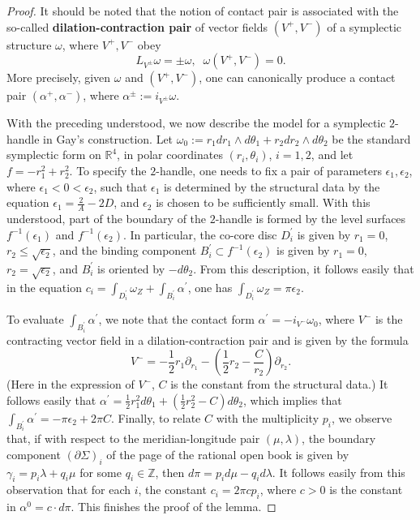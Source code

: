 \documentclass[11pt]{amsart}
\theoremstyle{plain}
\numberwithin{theorem}{section}
\theoremstyle{definition}
\newcommand{\R}{{\mathbb R}}
\newcommand{\Z}{{\mathbb Z}}
\begin{document}
\begin{proof}
It should be noted that the notion of contact pair is associated with the so-called {\bf dilation-contraction pair} of vector fields $(V^{+},V^{-})$ of a symplectic structure $\omega$, where $V^{+},V^{-}$ obey
$$
L_{V^{\pm}}\omega =\pm\omega, \;\; \omega(V^{+},V^{-})=0. 
$$
More precisely, given $\omega$ and $(V^{+},V^{-})$, one can canonically produce a contact pair 
$(\alpha^{+},\alpha^{-})$, where $\alpha^{\pm}:= i_{V^{\pm}}\omega$.

With the preceding understood, we now describe the model for a symplectic $2$-handle in Gay's construction. Let $\omega_0:=r_1 dr_1\wedge d\theta_1+ r_2 dr_2\wedge d\theta_2$ be the
standard symplectic form on $\R^4$, in polar coordinates $(r_i,\theta_i)$, $i=1,2$, and let
$f=-r_1^2+r_2^2$. To specify the $2$-handle, one needs to fix a pair of parameters $\epsilon_1,
\epsilon_2$, where $\epsilon_1<0<\epsilon_2$, such that $\epsilon_1$ is determined by 
the structural data by the equation $\epsilon_1=\frac{2}{A}-2D$, and $\epsilon_2$ is chosen to be sufficiently small. With this understood, part of the boundary of the $2$-handle is formed by the level surfaces $f^{-1}(\epsilon_1)$ and $f^{-1}(\epsilon_2)$. In particular, the co-core disc $D_i^\prime$ is given by $r_1=0$, $r_2\leq \sqrt{\epsilon_2}$, and the binding component $B_i^\prime\subset 
f^{-1}(\epsilon_2)$ is given by $r_1=0$, $r_2=\sqrt{\epsilon_2}$, and $B_i^\prime$ is oriented 
by $-d\theta_2$. From this description, it follows easily that in the equation
$c_i=\int_{D_i^\prime}\omega_Z+\int_{B_i^\prime}\alpha^\prime$, one has 
$\int_{D_i^\prime}\omega_Z=\pi\epsilon_2$.

To evaluate $\int_{B_i^\prime}\alpha^\prime$, we note that the contact form 
$\alpha^\prime=-i_{V^{-}}\omega_0$, where $V^{-}$ is the contracting vector field in a 
dilation-contraction pair and is given by the formula
$$
V^{-}= -\frac{1}{2} r_1\partial_{r_1}-(\frac{1}{2} r_2-\frac{C}{r_2})\partial_{r_2}.
$$
(Here in the expression of $V^{-}$, $C$ is the constant from the structural data.) 
It follows easily that $\alpha^\prime=\frac{1}{2} r_1^2 d\theta_1+(\frac{1}{2} r_2^2 -C)d\theta_2$, 
which implies that $\int_{B_i^\prime}\alpha^\prime=-\pi\epsilon_2+2\pi C$. Finally, to relate $C$ with
the multiplicity $p_i$, we observe that, if with respect to the meridian-longitude pair $(\mu,\lambda)$,
the boundary component $(\partial \Sigma)_i$ of the page of the rational open book is given by 
$\gamma_i=p_i\lambda+q_i\mu$ for some $q_i\in\Z$, then $d\pi=p_i d\mu-q_i d\lambda$. It follows easily from this observation that for each $i$, the constant $c_i=2\pi c p_i$,
where $c>0$ is the constant in $\alpha^0=c \cdot d\pi$. This finishes the proof of the lemma.

\end{proof}
\end{document}
